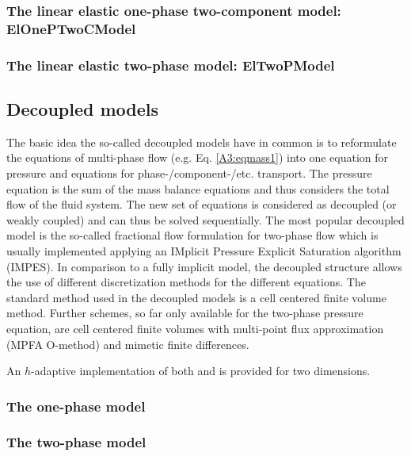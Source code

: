 \subsubsection{The linear elastic one-phase two-component model: ElOnePTwoCModel} 


\subsubsection{The linear elastic two-phase model: ElTwoPModel} 


\subsection{Decoupled models}
%
The basic idea the so-called decoupled models have in common is to reformulate the equations of multi-phase flow (e.g. Eq. \ref{A3:eqmass1}) into one equation for pressure and equations for phase-/component-/etc. transport. The pressure equation is the sum of the mass balance equations and thus considers the total flow of the fluid system. The new set of equations is considered as decoupled (or weakly coupled) and can thus be solved sequentially. The most popular decoupled model is the so-called fractional flow formulation for two-phase flow which is usually implemented applying an IMplicit Pressure Explicit Saturation algorithm (IMPES).
In comparison to a fully implicit model, the decoupled structure allows the use of different discretization methods for the different equations. The standard method used in the decoupled models is a cell centered finite volume method. Further schemes, so far only available for the two-phase pressure equation, are cell centered finite volumes with multi-point flux approximation (MPFA O-method) and mimetic finite differences.

An $h$-adaptive implementation of both  and  is provided for two dimensions.
%
\subsubsection{The one-phase model}


\subsubsection{The two-phase model}\label{ch:2p_decoupled}

